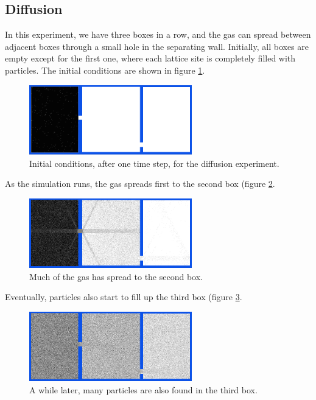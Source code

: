 \documentclass[12pt,a4paper]{article}
\begin{document}
\subsection{Diffusion}
In this experiment, we have three boxes in a row, and the gas can spread between adjacent boxes through a small
hole in the separating wall. Initially, all boxes are empty except for the first one, where each lattice site
is completely filled with particles. The initial conditions are shown in figure \ref{diffusioninit}.

\begin{figure}[htp]
\centering
  \includegraphics[width=200pt]{figs/diffusioninit.png}
\caption{Initial conditions, after one time step, for the diffusion experiment.}
\label{diffusioninit}
\end{figure}

As the simulation runs, the gas spreads first to the second box (figure \ref{diffusionbox2fill}.
\begin{figure}[htp]
\centering
  \includegraphics[width=200pt]{figs/diffusionbox2fill.png}
\caption{Much of the gas has spread to the second box.}
\label{diffusionbox2fill}
\end{figure}

Eventually, particles also start to fill up the third box (figure \ref{diffusionbox3fill}.
\begin{figure}[htp]
\centering
  \includegraphics[width=200pt]{figs/diffusionbox3fill.png}
\caption{A while later, many particles are also found in the third box.}
\label{diffusionbox3fill}
\end{figure}
\end{document}
